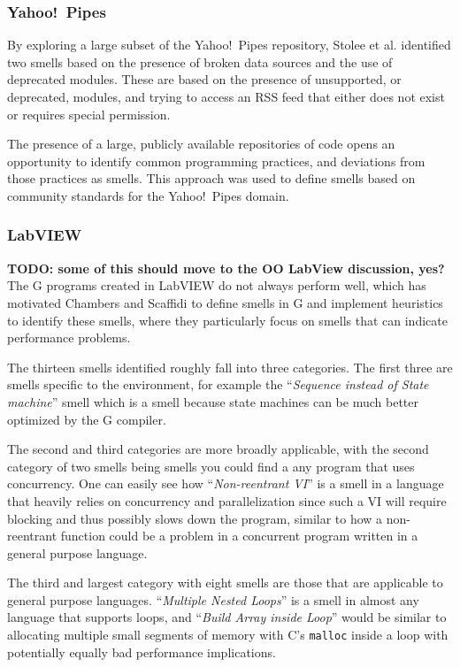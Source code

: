 \documentclass[10pt,conference,compsocconf]{IEEEtran}
\newcommand{\todo}[1]{\textbf{TODO: #1}}
\begin{document}
\subsubsection{Yahoo!\ Pipes}
By exploring a large subset of the Yahoo!\ Pipes repository, Stolee et al. identified two smells based on the presence of broken data sources and the use of deprecated modules. These are based on the presence of unsupported, or deprecated, modules, and trying to access an RSS feed that either does not exist or requires special permission. 

The presence of a large, publicly available repositories of code opens an opportunity to identify common programming practices, and deviations from those practices as smells. This approach was used to define smells based on community standards for the Yahoo!\ Pipes domain. 



\subsubsection{LabVIEW}
\todo{some of this should move to the OO LabView discussion, yes?}
The G programs created in LabVIEW do not always perform well, which has motivated Chambers and Scaffidi \cite{chambers2013smell} to define smells in G and implement heuristics to identify these smells, where they particularly focus on smells that can indicate performance problems.

The thirteen smells identified roughly fall into three categories.
The first three are smells specific to the environment, for example the ``\textit{Sequence instead of State machine}'' smell which is a smell because state machines can be much better optimized by the G compiler.

The second and third categories are more broadly applicable, with the second category of two smells being smells you could find a any program that uses concurrency.
One can easily see how ``\textit{Non-reentrant VI}'' is a smell in a language that heavily relies on concurrency and parallelization since such a VI will require blocking and thus possibly slows down the program, similar to how a non-reentrant function could be a problem in a concurrent program written in a general purpose language.

The third and largest category with eight smells are those that are applicable to general purpose languages.
``\textit{Multiple Nested Loops}'' is a smell in almost any language that supports loops, and ``\textit{Build Array inside Loop}'' would be similar to allocating multiple small segments of memory with C's \texttt{malloc} inside a loop with potentially equally bad performance implications.
\end{document}
